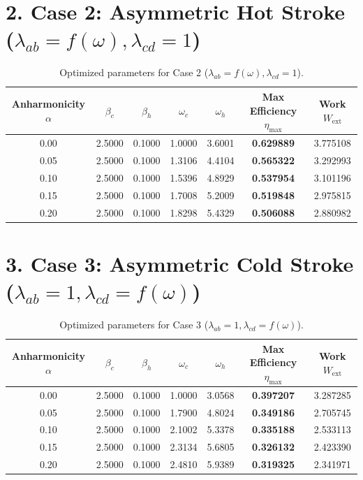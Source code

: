 \documentclass[11pt,a4paper]{article}
\begin{document}
\section*{2. Case 2: Asymmetric Hot Stroke ($\lambda_{ab} = f(\omega), \lambda_{cd} = 1$)}
\begin{table}[h!]
\centering
\caption{Optimized parameters for Case 2 ($\lambda_{ab}=f(\omega), \lambda_{cd}=1$).}
\begin{tabular}{ccccccc}
\toprule
\textbf{Anharmonicity $\alpha$} & $\beta_c$ & $\beta_h$ & $\omega_c$ & $\omega_h$ & \textbf{Max Efficiency $\eta_{\mathrm{max}}$} & \textbf{Work $W_{\mathrm{ext}}$} \\
\midrule
0.00 & 2.5000 & 0.1000 & 1.0000 & 3.6001 & \textbf{0.629889} & 3.775108 \\
0.05 & 2.5000 & 0.1000 & 1.3106 & 4.4104 & \textbf{0.565322} & 3.292993 \\
0.10 & 2.5000 & 0.1000 & 1.5396 & 4.8929 & \textbf{0.537954} & 3.101196 \\
0.15 & 2.5000 & 0.1000 & 1.7008 & 5.2009 & \textbf{0.519848} & 2.975815 \\
0.20 & 2.5000 & 0.1000 & 1.8298 & 5.4329 & \textbf{0.506088} & 2.880982 \\
\bottomrule
\end{tabular}
\end{table}

\section*{3. Case 3: Asymmetric Cold Stroke ($\lambda_{ab} = 1, \lambda_{cd} = f(\omega)$)}
\begin{table}[h!]
\centering
\caption{Optimized parameters for Case 3 ($\lambda_{ab}=1, \lambda_{cd}=f(\omega)$).}
\begin{tabular}{ccccccc}
\toprule
\textbf{Anharmonicity $\alpha$} & $\beta_c$ & $\beta_h$ & $\omega_c$ & $\omega_h$ & \textbf{Max Efficiency $\eta_{\mathrm{max}}$} & \textbf{Work $W_{\mathrm{ext}}$} \\
\midrule
0.00 & 2.5000 & 0.1000 & 1.0000 & 3.0568 & \textbf{0.397207} & 3.287285 \\
0.05 & 2.5000 & 0.1000 & 1.7900 & 4.8024 & \textbf{0.349186} & 2.705745 \\
0.10 & 2.5000 & 0.1000 & 2.1002 & 5.3378 & \textbf{0.335188} & 2.533113 \\
0.15 & 2.5000 & 0.1000 & 2.3134 & 5.6805 & \textbf{0.326132} & 2.423390 \\
0.20 & 2.5000 & 0.1000 & 2.4810 & 5.9389 & \textbf{0.319325} & 2.341971 \\
\bottomrule
\end{tabular}
\end{table}
\end{document}
